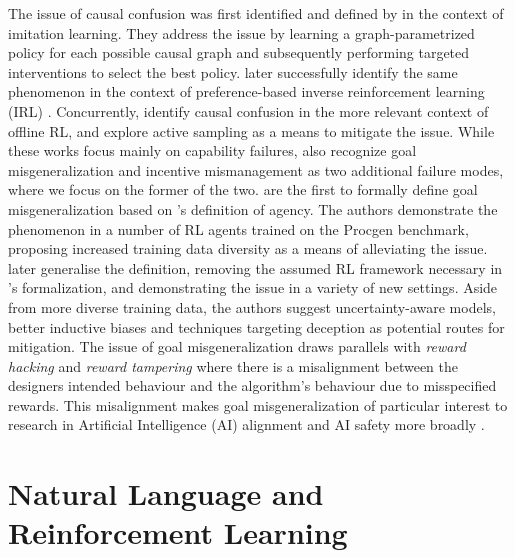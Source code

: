 \documentclass[../thesis-proposal/main.tex]{subfiles}
\begin{document}
The issue of causal confusion was first identified and defined by \citet{de_haan_causal_2019} in the
context of imitation learning. They address the issue by learning a graph-parametrized policy for
each possible causal graph and subsequently performing targeted interventions to select the best
policy.  later successfully identify the same phenomenon in the context of
preference-based \citep{christiano_deep_2017} inverse reinforcement learning (IRL)
\citep{ng_algorithms_2000}. Concurrently, \citet{gupta_can_2022} identify causal confusion in the
more relevant context of offline RL, and explore active sampling as a means to mitigate the issue.
While these works focus mainly on capability failures, \citet{kirk_causal_2022} also recognize goal
misgeneralization and incentive mismanagement \citep{farquhar_path-specific_2022} as two additional
failure modes, where we focus on the former of the two.  are the first to
formally define goal misgeneralization based on \citet{orseau_agents_2018}'s definition of agency.
The authors demonstrate the phenomenon in a number of RL agents trained on the Procgen
\citep{cobbe_leveraging_2020} benchmark, proposing increased training data diversity as a means of
alleviating the issue.  later generalise the definition, removing the assumed
RL framework necessary in \citet{langosco_goal_2022}'s formalization, and demonstrating the issue in
a variety of new settings. Aside from more diverse training data, the authors suggest
uncertainty-aware models, better inductive biases and techniques targeting deception as potential
routes for mitigation. The issue of goal misgeneralization draws parallels with \textit{reward
hacking} \citep{pan_effects_2022, skalse_defining_2022} and \textit{reward tampering}
\citep{everitt_reward_2021} where there is a misalignment between the designers intended behaviour
and the algorithm's behaviour due to misspecified rewards. This misalignment makes goal
misgeneralization of particular interest to research in Artificial Intelligence (AI) alignment
\citep{ngo_alignment_2022} and AI safety more broadly \citep{hendrycks_unsolved_2022,
houben_inspect_2022}.

\section{Natural Language and Reinforcement Learning} 
\end{document}
